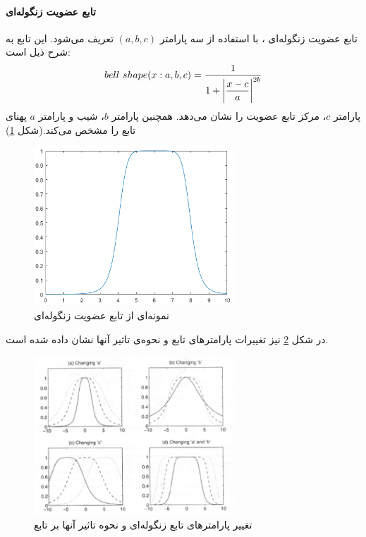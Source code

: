 \documentclass[12pt,a4paper]{article}
\theoremstyle{definition}
\begin{document}
\paragraph{تابع عضویت زنگوله‌ای}
تابع عضویت زنگوله‌ای
،
با استفاده از سه پارامتر $(a, b, c)$ تعریف می‌شود. این تابع به شرح ذیل است:
\begin{equation}\label{eq:e_fset_memfunc_bellshape}
bell\ shape (x: a, b, c) = \frac{1}{1+ \mathlarger{ \left| \frac{x-c}{a}\right| ^{2b}} }
\end{equation}
پارامتر $c$، مرکز تابع عضویت را نشان می‌دهد. همچنین پارامتر $b$، شیب و پارامتر $a$ پهنای تابع را مشخص می‌کند.(شکل \ref{fig:f_17})
 \\
\begin{figure}[h]
	\centering 
	\includegraphics[width=75mm]{Images/Fig17.png}
	\vspace{-0.5cm}
	\caption{نمونه‌ای از تابع عضویت زنگوله‌ای}\label{fig:f_17}
\end{figure}
در شکل 
\ref{fig:f_20}
نیز تغییرات پارامترهای تابع و نحوه‌ی تاثیر آنها نشان داده شده است. 
\cite{yen1999fuzzy}
\begin{figure}[h]
	\centering 
	\includegraphics[width=75mm]{Images/Fig20.png}
	\vspace{-0.5cm}
	\caption{تغییر پارامترهای تابع زنگوله‌ای و نحوه تاثیر آنها بر تابع}\label{fig:f_20}
\end{figure}
\end{document}
